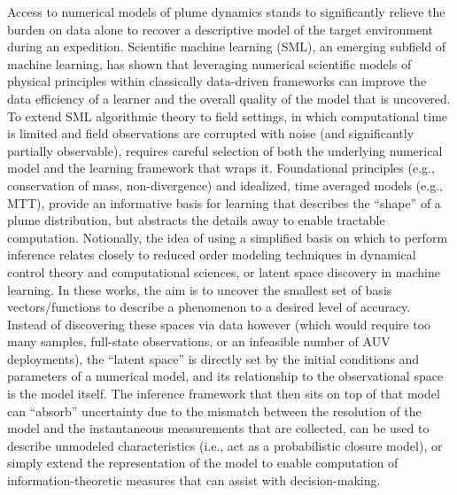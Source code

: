 Access to numerical models of plume dynamics stands to significantly relieve the burden on data alone to recover a descriptive model of the target environment during an expedition.
Scientific machine learning (SML), an emerging subfield of machine learning, has shown that leveraging numerical scientific models of physical principles within classically data-driven frameworks\autocite{raissi2019physics, sapsis2009dynamically, mohan2019compressed,raissi2018numerical,kulkarni2019advection, brunton2016discovering,jiahao2021knowledge} can improve the data efficiency of a learner and the overall quality of the model that is uncovered.
To extend SML algorithmic theory to field settings, in which computational time is limited and field observations are corrupted with noise (and significantly partially observable), requires careful selection of both the underlying numerical model and the learning framework that wraps it.
Foundational principles (e.g., conservation of mass, non-divergence) and idealized, time averaged models (e.g., MTT\autocite{morton1956turbulent}), provide an informative basis for learning that describes the ``shape'' of a plume distribution, but abstracts the details away to enable tractable computation.
Notionally, the idea of using a simplified basis on which to perform inference relates closely to reduced order modeling techniques in dynamical control theory and computational sciences\autocite{lucia2004reduced,burkardt2006pod,salam2019adaptive}, or latent space discovery in machine learning\autocite{voynov2020unsupervised,lu2020extracting}.
In these works, the aim is to uncover the smallest set of basis vectors/functions to describe a phenomenon to a desired level of accuracy.
Instead of discovering these spaces via data however (which would require too many samples, full-state observations, or an infeasible number of AUV deployments), the ``latent space'' is directly set by the initial conditions and parameters of a numerical model, and its relationship to the observational space is the model itself.
The inference framework that then sits on top of that model can ``absorb'' uncertainty due to the mismatch between the resolution of the model and the instantaneous measurements that are collected, can be used to describe unmodeled characteristics (i.e., act as a probabilistic closure model), or simply extend the representation of the model to enable computation of information-theoretic measures that can assist with decision-making.


